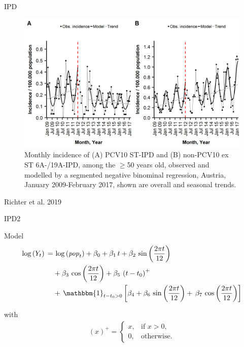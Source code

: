 \documentclass{beamer}\usepackage[]{graphicx}\usepackage[]{color}
\newcommand{\Sin}[1]{\sin\left(#1\right)}%
\newcommand{\Cos}[1]{\cos\left(#1\right)}%
\newcommand{\Log}[1]{\log\left(#1\right)}%
\newcommand{\mli}[1]{\mathit{#1}}%
\begin{document}
\begin{frame}[fragile]{IPD}
\begin{center}
\begin{figure}
  \centering
  \caption{Monthly incidence of (A) PCV10 ST-IPD and (B) non-PCV10 ex ST 6A-/19A-IPD, among the $\ge$50 years old, observed and modelled by a segmented negative binominal regression, Austria, January 2009-February 2017, shown are overall and seasonal trends.}
  \includegraphics[width=\textwidth,height=0.5\textheight,keepaspectratio]{richter2019_Fig3.png}
\end{figure}
\end{center}

\vfill
{\scriptsize Richter et al. 2019}
\end{frame}

\begin{frame}[fragile]{IPD2}

\begin{block}{Model}
\begin{align*}
\begin{split}
\Log{Y_t}\, =
  &\, \Log{\mli{pop}_t} + \beta_0+\beta_1\,t + \beta_2\,\Sin{\frac{2 \pi t}{12}} \\
  &+ \beta_3\,\Cos{\frac{2 \pi t}{12}} + \beta_5\,\left(t-t_0\right)^+ \\
  &+\, \mathbbm{1}_{t-t_0>0} \left[\beta_4 + \beta_6\,\sin\left(\frac{2 \pi t}{12}\right) + \,\beta_7\,\cos\left(\frac{2 \pi t}{12}\right)\right]
\end{split}
\end{align*}

with
\begin{align*} 
(x)^+ = 
\begin{cases}
x, &\text{if $x > 0$,}\\
0, &\text{otherwise.}
\end{cases}
\end{align*}
\end{block}

\end{frame}
\end{document}
